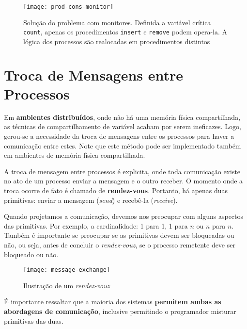 
\begin{figure}[H]
  \centering
  \texttt{[image: prod-cons-monitor]}
  \caption{Solução do problema com monitores. Definida a variável crítica \texttt{count}, apenas os procedimentos \texttt{insert} e \texttt{remove} podem opera-la. A lógica dos processos são realocadas em procedimentos distintos}
  \label{fig:prod-cons-monitor}
\end{figure}









\section{Troca de Mensagens entre Processos}
Em \textbf{ambientes distribuídos}, onde não há uma memória física compartilhada, as técnicas de compartilhamento de variável acabam por serem ineficazes. Logo, gerou-se a necessidade da troca de mensagens entre os processos para haver a comunicação entre estes. Note que este método pode ser implementado também em ambientes de memória física compartilhada.

A troca de mensagem entre processos é explicita, onde toda comunicação existe no ato de um processo enviar a mensagem e o outro receber. O momento onde a troca ocorre de fato é chamado de \textbf{rendez-vous}. Portanto, há apenas duas primitivas: enviar a mensagem (\textit{send}) e recebê-la (\textit{receive}).

Quando projetamos a comunicação, devemos nos preocupar com alguns aspectos das primitivas. Por exemplo, a cardinalidade: 1 para 1, 1 para $n$ ou $n$ para $n$. Também é importante se preocupar se as primitivas devem ser bloqueadas ou não, ou seja, antes de concluir o \textit{rendez-vouz}, se o processo remetente deve ser bloqueado ou não.

\begin{figure}[h]
  \centering
  \texttt{[image: message-exchange]}
  \caption{Ilustração de um \textit{rendez-vouz}}
  \label{fig:rendez-vouz}
\end{figure}

É importante ressaltar que a maioria dos sistemas \textbf{permitem ambas as abordagens de comunicação}, inclusive permitindo o programador misturar primitivas das duas.

